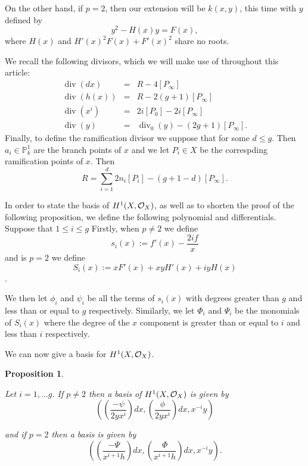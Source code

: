 \documentclass[draft, 11pt]{article} %
\theoremstyle{plain}
\newtheorem{prop}[defn]{Proposition}
\theoremstyle{remark}
\newcommand{\cO}{{\cal O}}
\DeclareMathOperator{\di}{div}
\begin{document}
On the other hand, if $p=2$, then our extension will be $k(x,y)$, this time with $y$ defined by
\[
	y^2 - H(x)y = F(x),
\]
where $H(x)$ and $H'(x)^2F(x) + F'(x)^2$ share no roots.

We recall the following divisors, which we will make use of throughout this article:
\begin{eqnarray*}
\di (dx) & = & R - 4[P_\infty] \\
\di (h(x)) & = & R - 2(g+1)[P_\infty] \\
\di (x^i) & = & 2i[P_0] - 2i[P_\infty]\\
\di (y) & = & \di_0(y) - (2g+1)[P_\infty].
\end{eqnarray*}
Finally, to define the ramification divisor we suppose that  for some $d \leq g$.
Then $a_i \in \mathbb P_k^1$ are the branch points of $x$ and we let $P_i \in X$ be the correspding ramification points of $x$.
Then 
\[
R = \sum_{i=1}^d 2n_i[P_i] - (g+1-d)[P_\infty].
\]


In order to state the basis of $H^1(X,\cO_X)$, as well as to shorten the proof of the following proposition, we define the following polynomial and differentials.
Suppose that $1 \leq i \leq g$
Firstly, when $p\neq 2$ we define 
\[
	s_i(x) := f'(x) - \frac{2if}{x}
\]
and is $p = 2$ we define
\[
	S_i(x) := xF'(x) + xyH'(x) + iyH(x)
\].

We then let $\phi_i$ and $\psi_i$ be all the terms of $s_i(x)$ with degrees greater than $g$ and less than or equal to $g$ respectively.
Similarly, we let $\Phi_i$ and $\Psi_i$ be the monomials of $S_i(x)$ where the degree of the $x$ component is greater than or equal to $i$ and less than $i$ respectively.

We can now give a basis for $H^1(X,\cO_X)$.

\begin{prop}\label{basis}

Let $i=1,\ldots g$. If $p\neq 2$ then a basis of $H^1(X,\cO_X)$ is given by 
\[
	\left( \left( \frac{-\psi}{2yx^i}\right) dx, \left(\frac{\phi}{2yx^i}\right) dx, x^{-i}y\right)
\]

and if $p=2$ then a basis is given by
\[
	\left( \left(\frac{-\Psi}{x^{i+1}h}\right) dx, \left( \frac{\Phi}{x^{i+1}h} \right) dx, x^{-i}y \right).
\]
\end{prop}
\end{document}
